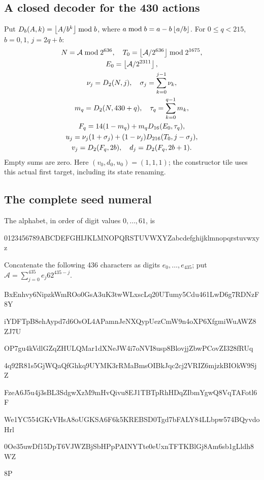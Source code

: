 \subsection{A closed decoder for the 430 actions}
Put $D_b(A,k)=\left\lfloor A/b^k\right\rfloor\bmod b$, where
$a\bmod b=a-b\left\lfloor a/b\right\rfloor$. For $0\le q<215$, $b=0,1$, $j=2q+b$:
\[
\begin{gathered}
N=\mathcal A\bmod2^{636},\quad
T_0=\left\lfloor\mathcal A/2^{636}\right\rfloor\bmod2^{1675},\\
E_0=\left\lfloor\mathcal A/2^{2311}\right\rfloor,\\
\nu_j=D_2(N,j),\quad \sigma_j=\sum_{k=0}^{j-1}\nu_k,\\
m_q=D_2(N,430+q),\quad \tau_q=\sum_{k=0}^{q-1}m_k,\\
F_q=14(1-m_q)+m_qD_{16}(E_0,\tau_q),\\
u_j=\nu_j(1+\sigma_j)+(1-\nu_j)D_{216}(T_0,j-\sigma_j),\\
v_j=D_2(F_q,2b),\quad d_j=D_2(F_q,2b+1).
\end{gathered}
\]
Empty sums are zero. Here $(v_0,d_0,u_0)=(1,1,1)$; the constructor tile
uses this actual first target, including its state renaming.

\subsection{The complete seed numeral}
The alphabet, in order of digit values $0,\ldots,61$, is
\begin{center}\small\ttfamily
0123456789ABCDEFGHIJKLMNOPQRSTUVWXYZabcdefghijklmnopqrstuvwxyz
\end{center}
Concatenate the following 436 characters as digits $e_0,\ldots,e_{435}$;
put $\mathcal A=\sum_{j=0}^{435}e_j62^{435-j}$.\par
\begingroup\small\ttfamily
BxEnhvy6NipzkWmROo0GsA3uK3twWLxscLq20UTumy5Cdu461LwD6g7RDNzF8Y\par
iYDFTpB8ehAypd7d6OsOL4APamnJeNXQypUezCmW9n4oXP6XfgmiWuAWZ8ZJ7U\par
OP7gu4kVdlGZqZHULQMar1dXNeJW4i7oNVI8usp8BlovjjZbwPCovZI328fRUq\par
4q92R81s5GjWQaQfGhkq9UYMK3rRMaBmsOIBkJqc2cj2VRIZ6mjzkBIOkW9SjZ\par
FzeA6J5u4j3sBL3SdgwXzM9mHvQivu8EJ1TBTpRhHDqZIbmYgwQ8VqTAFotl6F\par
We1YC554GKrVHsA8oUGKSA6F6k5KREBSD0Tgd7bFALY84LLbpw574BQyvdoHrl\par
0Oe35uwDf15DpT6VJWZBjSbHPpPAINYTte0eUxnTFTKBlGj8Am6sb1gLldh8WZ\par
8P\par
\endgroup
